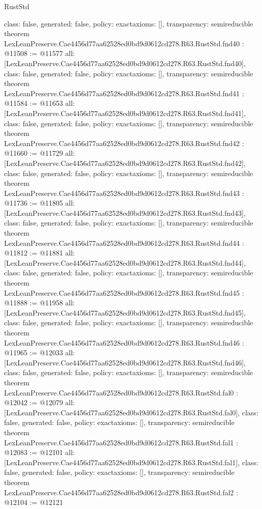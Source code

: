 \begin{lexlean}{RustStd}
\begin{coremodule}
{  class: false,
  generated: false,
  policy: exact{axioms: []},
  transparency: semireducible
}
theorem LexLeanPreserve.Cae4456d77aa62528ed0bd9d0612cd278.R63.RustStd.fnd40 : @11508 := @11577 {
  all: [LexLeanPreserve.Cae4456d77aa62528ed0bd9d0612cd278.R63.RustStd.fnd40],
  class: false,
  generated: false,
  policy: exact{axioms: []},
  transparency: semireducible
}
theorem LexLeanPreserve.Cae4456d77aa62528ed0bd9d0612cd278.R63.RustStd.fnd41 : @11584 := @11653 {
  all: [LexLeanPreserve.Cae4456d77aa62528ed0bd9d0612cd278.R63.RustStd.fnd41],
  class: false,
  generated: false,
  policy: exact{axioms: []},
  transparency: semireducible
}
theorem LexLeanPreserve.Cae4456d77aa62528ed0bd9d0612cd278.R63.RustStd.fnd42 : @11660 := @11729 {
  all: [LexLeanPreserve.Cae4456d77aa62528ed0bd9d0612cd278.R63.RustStd.fnd42],
  class: false,
  generated: false,
  policy: exact{axioms: []},
  transparency: semireducible
}
theorem LexLeanPreserve.Cae4456d77aa62528ed0bd9d0612cd278.R63.RustStd.fnd43 : @11736 := @11805 {
  all: [LexLeanPreserve.Cae4456d77aa62528ed0bd9d0612cd278.R63.RustStd.fnd43],
  class: false,
  generated: false,
  policy: exact{axioms: []},
  transparency: semireducible
}
theorem LexLeanPreserve.Cae4456d77aa62528ed0bd9d0612cd278.R63.RustStd.fnd44 : @11812 := @11881 {
  all: [LexLeanPreserve.Cae4456d77aa62528ed0bd9d0612cd278.R63.RustStd.fnd44],
  class: false,
  generated: false,
  policy: exact{axioms: []},
  transparency: semireducible
}
theorem LexLeanPreserve.Cae4456d77aa62528ed0bd9d0612cd278.R63.RustStd.fnd45 : @11888 := @11958 {
  all: [LexLeanPreserve.Cae4456d77aa62528ed0bd9d0612cd278.R63.RustStd.fnd45],
  class: false,
  generated: false,
  policy: exact{axioms: []},
  transparency: semireducible
}
theorem LexLeanPreserve.Cae4456d77aa62528ed0bd9d0612cd278.R63.RustStd.fnd46 : @11965 := @12033 {
  all: [LexLeanPreserve.Cae4456d77aa62528ed0bd9d0612cd278.R63.RustStd.fnd46],
  class: false,
  generated: false,
  policy: exact{axioms: []},
  transparency: semireducible
}
theorem LexLeanPreserve.Cae4456d77aa62528ed0bd9d0612cd278.R63.RustStd.fal0 : @12042 := @12079 {
  all: [LexLeanPreserve.Cae4456d77aa62528ed0bd9d0612cd278.R63.RustStd.fal0],
  class: false,
  generated: false,
  policy: exact{axioms: []},
  transparency: semireducible
}
theorem LexLeanPreserve.Cae4456d77aa62528ed0bd9d0612cd278.R63.RustStd.fal1 : @12083 := @12101 {
  all: [LexLeanPreserve.Cae4456d77aa62528ed0bd9d0612cd278.R63.RustStd.fal1],
  class: false,
  generated: false,
  policy: exact{axioms: []},
  transparency: semireducible
}
theorem LexLeanPreserve.Cae4456d77aa62528ed0bd9d0612cd278.R63.RustStd.fal2 : @12104 := @12121 {
}
\end{coremodule}
\end{lexlean}
